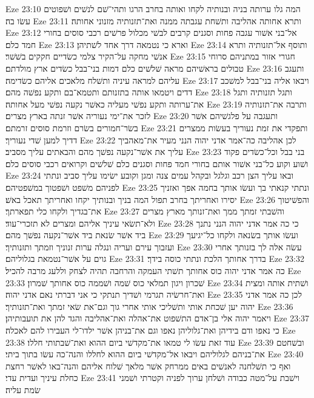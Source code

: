 Eze 23:10  המה גלו ערותה בניה ובנותיה לקחו ואותה בחרב הרגו ותהי־שׁם לנשׁים ושׁפוטים עשׂו בה׃
Eze 23:11  ותרא אחותה אהליבה ותשׁחת עגבתה ממנה ואת־תזנותיה מזנוני אחותה׃
Eze 23:12  אל־בני אשׁור עגבה פחות וסגנים קרבים לבשׁי מכלול פרשׁים רכבי סוסים בחורי חמד כלם׃
Eze 23:13  וארא כי נטמאה דרך אחד לשׁתיהן׃
Eze 23:14  ותוסף אל־תזנותיה ותרא אנשׁי מחקה על־הקיר צלמי כשׂדיים חקקים בשׁשׁר׃
Eze 23:15  חגורי אזור במתניהם סרוחי טבולים בראשׁיהם מראה שׁלשׁים כלם דמות בני־בבל כשׂדים ארץ מולדתם׃
Eze 23:16  ותעגב עליהם למראה עיניה ותשׁלח מלאכים אליהם כשׂדימה׃
Eze 23:17  ויבאו אליה בני־בבל למשׁכב דדים ויטמאו אותה בתזנותם ותטמא־בם ותקע נפשׁה מהם׃
Eze 23:18  ותגל תזנותיה ותגל את־ערותה ותקע נפשׁי מעליה כאשׁר נקעה נפשׁי מעל אחותה׃
Eze 23:19  ותרבה את־תזנותיה לזכר את־ימי נעוריה אשׁר זנתה בארץ מצרים׃
Eze 23:20  ותעגבה על פלגשׁיהם אשׁר בשׂר־חמורים בשׂרם וזרמת סוסים זרמתם׃
Eze 23:21  ותפקדי את זמת נעוריך בעשׂות ממצרים דדיך למען שׁדי נעוריך׃
Eze 23:22  לכן אהליבה כה־אמר אדני יהוה הנני מעיר את־מאהביך עליך את אשׁר־נקעה נפשׁך מהם והבאתים עליך מסביב׃
Eze 23:23  בני בבל וכל־כשׂדים פקוד ושׁוע וקוע כל־בני אשׁור אותם בחורי חמד פחות וסגנים כלם שׁלשׁים וקרואים רכבי סוסים כלם׃
Eze 23:24  ובאו עליך הצן רכב וגלגל ובקהל עמים צנה ומגן וקובע ישׂימו עליך סביב ונתתי לפניהם משׁפט ושׁפטוך במשׁפטיהם׃
Eze 23:25  ונתתי קנאתי בך ועשׂו אותך בחמה אפך ואזניך יסירו ואחריתך בחרב תפול המה בניך ובנותיך יקחו ואחריתך תאכל באשׁ׃
Eze 23:26  והפשׁיטוך את־בגדיך ולקחו כלי תפארתך׃
Eze 23:27  והשׁבתי זמתך ממך ואת־זנותך מארץ מצרים ולא־תשׂאי עיניך אליהם ומצרים לא תזכרי־עוד׃
Eze 23:28  כי כה אמר אדני יהוה הנני נתנך ביד אשׁר שׂנאת ביד אשׁר־נקעה נפשׁך מהם׃
Eze 23:29  ועשׂו אותך בשׂנאה ולקחו כל־יגיעך ועזבוך עירם ועריה ונגלה ערות זנוניך וזמתך ותזנותיך׃
Eze 23:30  עשׂה אלה לך בזנותך אחרי גוים על אשׁר־נטמאת בגלוליהם׃
Eze 23:31  בדרך אחותך הלכת ונתתי כוסה בידך׃
Eze 23:32  כה אמר אדני יהוה כוס אחותך תשׁתי העמקה והרחבה תהיה לצחק וללעג מרבה להכיל׃
Eze 23:33  שׁכרון ויגון תמלאי כוס שׁמה ושׁממה כוס אחותך שׁמרון׃
Eze 23:34  ושׁתית אותה ומצית ואת־חרשׂיה תגרמי ושׁדיך תנתקי כי אני דברתי נאם אדני יהוה׃
Eze 23:35  לכן כה אמר אדני יהוה יען שׁכחת אותי ותשׁליכי אותי אחרי גוך וגם־את שׂאי זמתך ואת־תזנותיך׃
Eze 23:36  ויאמר יהוה אלי בן־אדם התשׁפוט את־אהלה ואת־אהליבה והגד להן את תועבותיהן׃
Eze 23:37  כי נאפו ודם בידיהן ואת־גלוליהן נאפו וגם את־בניהן אשׁר ילדו־לי העבירו להם לאכלה׃
Eze 23:38  עוד זאת עשׂו לי טמאו את־מקדשׁי ביום ההוא ואת־שׁבתותי חללו׃
Eze 23:39  ובשׁחטם את־בניהם לגלוליהם ויבאו אל־מקדשׁי ביום ההוא לחללו והנה־כה עשׂו בתוך ביתי׃
Eze 23:40  ואף כי תשׁלחנה לאנשׁים באים ממרחק אשׁר מלאך שׁלוח אליהם והנה־באו לאשׁר רחצת כחלת עיניך ועדית עדי׃
Eze 23:41  וישׁבת על־מטה כבודה ושׁלחן ערוך לפניה וקטרתי ושׁמני שׂמת עליה׃
